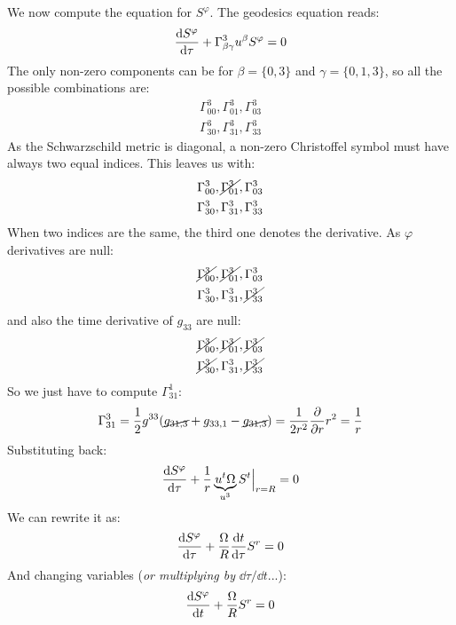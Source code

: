 \documentclass[../template.tex]{subfiles}
\begin{document}
We now compute the equation for $S^\varphi$. The geodesics equation reads:
\begin{align*}
    \dv{S^\varphi}{\tau} + \Gamma^3_{\beta \gamma} u^\beta S^\varphi = 0
\end{align*}
The only non-zero components can be for $\beta = \{0,3\}$ and $\gamma = \{0,1,3\}$, so all the possible combinations are:
\begin{align*}
    \Gamma^3_{00}, \Gamma^3_{01}, \Gamma_{03}^3\\
    \Gamma^3_{30}, \Gamma^3_{31}, \Gamma^3_{33}
\end{align*}   
As the Schwarzschild metric is diagonal, a non-zero Christoffel symbol must have always two equal indices. This leaves us with:
\begin{align*}
    \Gamma^3_{00}, \cancel{\Gamma^3_{01}}, \Gamma_{03}^3\\
    \Gamma^3_{30}, \Gamma^3_{31}, \Gamma^3_{33}
\end{align*}
When two indices are the same, the third one denotes the derivative. As $\varphi$ derivatives are null:
\begin{align*}
    \cancel{\Gamma^3_{00}},\cancel{ \Gamma^3_{01}}, \Gamma_{03}^3\\
    \Gamma^3_{30}, \Gamma^3_{31}, \cancel{\Gamma^3_{33}}
\end{align*}  
and also the time derivative of $g_{33}$ are null:
\begin{align*}
    \cancel{\Gamma^3_{00}}, \cancel{\Gamma^3_{01}}, \cancel{\Gamma_{03}^3}\\
    \cancel{\Gamma^3_{30}}, \Gamma^3_{31}, \cancel{\Gamma^3_{33}}
\end{align*} 
So we just have to compute $\Gamma_{31}^1$:
\begin{align*}
    \Gamma^3_{31} = \frac{1}{2} g^{33} (\cancel{g_{31,3}} + g_{33,1} - \cancel{g_{31,3}}) = \frac{1}{2r^2} \pdv{r} r^2 = \frac{1}{r}   
\end{align*} 
Substituting back:
\begin{align*}
    \dv{S^\varphi}{\tau} + \frac{1}{r} \underbrace{u^t \Omega}_{u^3}  S^t \Big|_{r=R} = 0
\end{align*}
We can rewrite it as:
\begin{align*}
    \dv{S^\varphi}{\tau} + \frac{\Omega}{R} \dv{t}{\tau} S^r = 0 
\end{align*}
And changing variables (\textit{or multiplying by } $\dd{\tau}/\dd{t}$...):
\begin{align*}
    \dv{S^\varphi}{t} + \frac{\Omega}{R} S^r = 0 
\end{align*}
\end{document}
